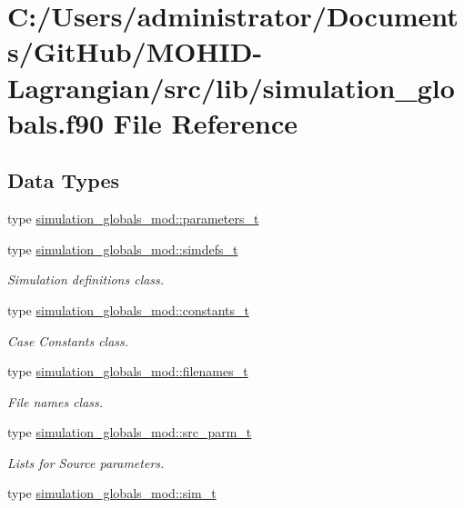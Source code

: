 \hypertarget{simulation__globals_8f90}{}\section{C\+:/\+Users/administrator/\+Documents/\+Git\+Hub/\+M\+O\+H\+I\+D-\/\+Lagrangian/src/lib/simulation\+\_\+globals.f90 File Reference}
\label{simulation__globals_8f90}
\subsection*{Data Types}
\begin{DoxyCompactItemize}
\item 
type \mbox{\hyperlink{structsimulation__globals__mod_1_1parameters__t}{simulation\+\_\+globals\+\_\+mod\+::parameters\+\_\+t}}
\item 
type \mbox{\hyperlink{structsimulation__globals__mod_1_1simdefs__t}{simulation\+\_\+globals\+\_\+mod\+::simdefs\+\_\+t}}
\begin{DoxyCompactList}\small\item\em Simulation definitions class. \end{DoxyCompactList}\item 
type \mbox{\hyperlink{structsimulation__globals__mod_1_1constants__t}{simulation\+\_\+globals\+\_\+mod\+::constants\+\_\+t}}
\begin{DoxyCompactList}\small\item\em Case Constants class. \end{DoxyCompactList}\item 
type \mbox{\hyperlink{structsimulation__globals__mod_1_1filenames__t}{simulation\+\_\+globals\+\_\+mod\+::filenames\+\_\+t}}
\begin{DoxyCompactList}\small\item\em File names class. \end{DoxyCompactList}\item 
type \mbox{\hyperlink{structsimulation__globals__mod_1_1src__parm__t}{simulation\+\_\+globals\+\_\+mod\+::src\+\_\+parm\+\_\+t}}
\begin{DoxyCompactList}\small\item\em Lists for Source parameters. \end{DoxyCompactList}\item 
type \mbox{\hyperlink{structsimulation__globals__mod_1_1sim__t}{simulation\+\_\+globals\+\_\+mod\+::sim\+\_\+t}}

\end{DoxyCompactItemize}
